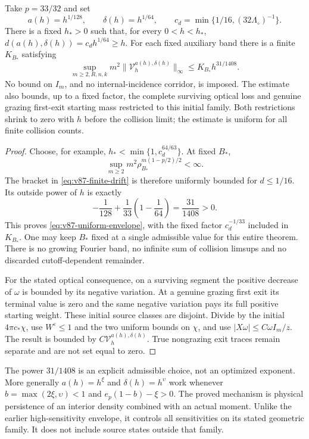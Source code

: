 \begin{theorem}
\label{thm:v87-moving-envelope}
Take $p=33/32$ and set
\[
 a(h)=h^{1/128},\qquad \delta(h)=h^{1/64},\qquad
 c_d=\min\{1/16,(32\Lambda_\circ)^{-1}\}.
\]
There is a fixed $h_*>0$ such that, for every $0<h<h_*$,
$d(a(h),\delta(h))=c_dh^{1/64}\ge h$. For each fixed auxiliary
band there is a finite $K_{B_*}$ satisfying
\begin{equation}\label{eq:v87-uniform-envelope}
 \sup_{m\ge2,R,n,k}m^2
   \|\mathcal V_h^{a(h),\delta(h)}\|_\infty
                         \le K_{B_*}h^{31/1408}.
\end{equation}
No bound on $I_m$, and no internal-incidence corridor, is imposed.
The estimate also bounds, up to a fixed factor, the complete
surviving optical loss and genuine grazing first-exit starting mass
restricted to this initial family. Both restrictions shrink to zero
with $h$ before the collision limit; the estimate is uniform for
all finite collision counts.
\end{theorem}
\begin{proof}
Choose, for example, $h_*<\min\{1,c_d^{64/63}\}$. At fixed $B_*$,
\[
 \sup_{m\ge2}m^2\rho_{B_*}^{m(1-p/2)/2}<\infty.
\]
The bracket in \eqref{eq:v87-finite-drift} is therefore uniformly
bounded for $d\le1/16$. Its outside power of $h$ is exactly
\[
 -\frac1{128}+\frac1{33}\left(1-\frac1{64}\right)
                                  =\frac{31}{1408}>0.
\]
This proves \eqref{eq:v87-uniform-envelope}, with the fixed factor
$c_d^{-1/33}$ included in $K_{B_*}$. One may keep $B_*$ fixed at a
single admissible value for this entire theorem. There is no growing
Fourier band, no infinite sum of collision limsups and no discarded
cutoff-dependent remainder.

For the stated optical consequence, on a surviving segment the
positive decrease of $\omega$ is bounded by its negative variation.
At a genuine grazing first exit its terminal value is zero and the
same negative variation pays its full positive starting weight.
These initial source classes are disjoint. Divide by the initial
$4\pi c_*\chi$, use $W^\varepsilon\le1$ and the two uniform bounds
on $\chi$, and use $|X\omega|\le C\omega I_m/z$. The result is
bounded by $C\mathcal V_h^{a(h),\delta(h)}$. True nongrazing exit
traces remain separate and are not set equal to zero.
\end{proof}

The power $31/1408$ is an explicit admissible choice, not an optimized
exponent. More generally $a(h)=h^\xi$ and $\delta(h)=h^\upsilon$
work whenever $b=\max(2\xi,\upsilon)<1$ and
$e_p(1-b)-\xi>0$. The proved mechanism is physical persistence of
an interior density combined with an actual moment. Unlike the earlier
high-sensitivity envelope, it controls all sensitivities on its stated
geometric family. It does not include source states outside that family.
